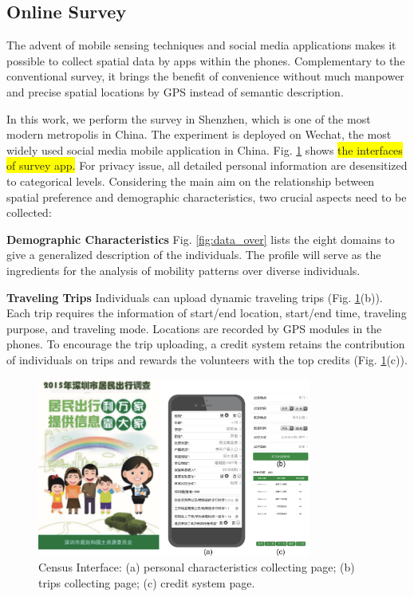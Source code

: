 \documentclass{ieeeaccess}
\begin{document}
\subsection{Online Survey}

The advent of mobile sensing techniques and social media applications makes it possible to collect spatial data by apps within the phones. Complementary to the conventional survey, it brings the benefit of convenience without much manpower and precise spatial locations by GPS instead of semantic description.

In this work, we perform the survey in Shenzhen, which is one of the most modern metropolis in China. The experiment is deployed on Wechat, the most widely used social media mobile application in China. Fig. \ref{fig:app} shows \colorbox{yellow}{the interfaces of survey app.} For privacy issue, all detailed personal information are desensitized to categorical levels. Considering the main aim on the relationship between spatial preference and demographic characteristics, two crucial aspects need to be collected:

\textbf{Demographic Characteristics} Fig. \ref{fig:data_over} lists the eight domains to give a generalized description of the individuals. The profile will serve as the ingredients for the analysis of mobility patterns over diverse individuals.

\textbf{Traveling Trips} Individuals can upload dynamic traveling trips (Fig. \ref{fig:app}(b)). Each trip requires the information of start/end location, start/end time, traveling purpose, and traveling mode. Locations are recorded by GPS modules in the phones. To encourage the trip uploading, a credit system retains the contribution of individuals on trips and rewards the volunteers with the top credits (Fig. \ref{fig:app}(c)).


\begin{figure}
 \centering
 \includegraphics[width=9cm]{pictures/survey_app}
  \captionsetup{justification=centering}
 \caption{Census Interface: (a) personal characteristics collecting page; (b) trips collecting page; (c) credit system page.}
 \label{fig:app}
\end{figure}
\end{document}
